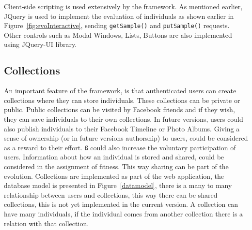 \documentclass{sig-alternate}
\begin{document}
Client-side scripting is used extensively by the framework. As mentioned earlier, JQuery is used to implement the evaluation of individuals as shown earlier in Figure~\ref{fig:evoInteractive}, sending \texttt{getSample()} and \texttt{putSample()} requests.   Other controls such as Modal Windows, Lists, Buttons are also implemented using JQuery-UI library.

\subsection{Collections}
An important feature of the framework, is that authenticated users can create collections where they can store individuals. These collections can be private or public. Public collections can be visited by Facebook friends and if they wish, they can save individuals to their own collections. In future versions, users could also publish individuals to their Facebook Timeline or Photo Albums. Giving a sense of ownership (or in future versions authorship) to users, could be considered as a reward to their effort. ß could also increase the voluntary participation of users. Information about how an individual is stored and shared, could be considered in the assignment of fitness. This way sharing can be part of the evolution. Collections are implemented as part of the web application, the database model is presented in Figure~\ref{datamodel}, there is a many to many relationship between users and collections, this way there can be shared collections, this is not yet implemented in the current version.  A collection can have many individuals, if the individual comes from another collection there is a relation with that collection.
\end{document}
